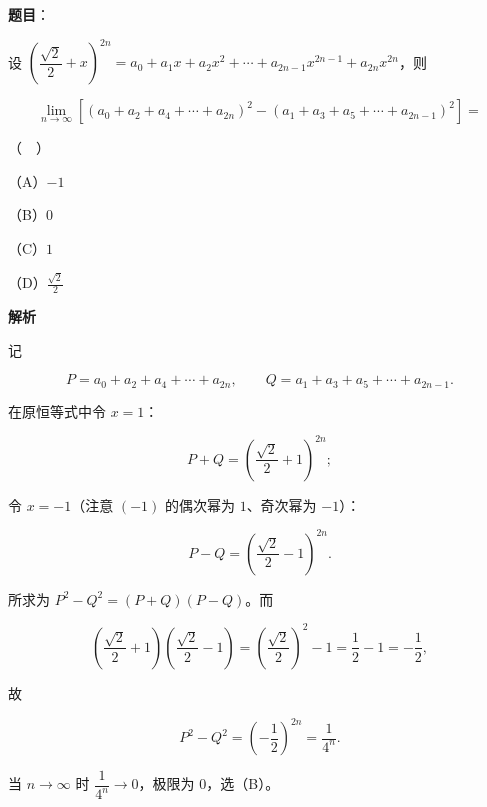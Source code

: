 \begin{answer}

\textbf{题目}：

设 $\left(\dfrac{\sqrt2}{2}+x\right)^{2n}=a_0+a_1x+a_2x^2+\cdots+a_{2n-1}x^{2n-1}+a_{2n}x^{2n}$，则

\nopagebreak[4]
\[\lim_{n\to\infty}\left[(a_0+a_2+a_4+\cdots+a_{2n})^2-(a_1+a_3+a_5+\cdots+a_{2n-1})^2\right]=\]

（　）

（A）$-1$

（B）$0$

（C）$1$

（D）$\frac{\sqrt2}{2}$

\textbf{解析}

记

\nopagebreak[4]
\[P=a_0+a_2+a_4+\cdots+a_{2n},\qquad Q=a_1+a_3+a_5+\cdots+a_{2n-1}.\]

在原恒等式中令 $x=1$：

\nopagebreak[4]
\[P+Q=\left(\frac{\sqrt2}{2}+1\right)^{2n};\]

令 $x=-1$（注意 $(-1)$ 的偶次幂为 $1$、奇次幂为 $-1$）：

\nopagebreak[4]
\[P-Q=\left(\frac{\sqrt2}{2}-1\right)^{2n}.\]

所求为 $P^2-Q^2=(P+Q)(P-Q)$。而

\nopagebreak[4]
\[\left(\frac{\sqrt2}{2}+1\right)\left(\frac{\sqrt2}{2}-1\right)=\left(\frac{\sqrt2}{2}\right)^2-1=\frac12-1=-\frac12,\]

故

\nopagebreak[4]
\[P^2-Q^2=\left(-\frac12\right)^{2n}=\frac{1}{4^n}.\]

当 $n\to\infty$ 时 $\dfrac1{4^n}\to0$，极限为 $0$，选（B）。


\end{answer}
